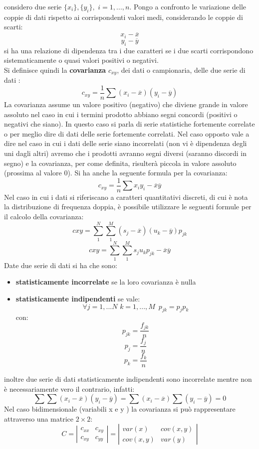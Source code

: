 \documentclass[a4paper,12pt, oneside]{book}
\begin{document}
considero due serie $\{x_i\},\{y_i\},\,\,i=1,...,n$. Pongo a confronto le variazione delle coppie di dati rispetto ai corrispondenti valori medi, considerando le coppie di scarti:
$$x_i-\overline{x}$$
$$y_i-\overline{y}$$
si ha una relazione di dipendenza tra i due caratteri se i due scarti corrispondono sistematicamente o quasi valori positivi o negativi.\\
Si definisce quindi la \textbf{covarianza} $c_{xy}$, dei dati o campionaria, delle due serie di dati :
$$c_{xy}=\frac{1}{n}\sum (x_i-\overline{x})(y_i-\overline{y})$$
La covarianza assume un valore positivo (negativo) che diviene grande in valore assoluto nel caso in cui i termini prodotto abbiano segni concordi (positivi o negativi che siano). In questo caso si parla di serie statistiche fortemente correlate o per meglio dire di
dati delle serie fortemente correlati. Nel caso opposto vale a dire nel caso in cui i dati delle serie siano incorrelati (non vi è dipendenza degli uni dagli altri) avremo che i prodotti avranno segni diversi (saranno discordi in segno) e la covarianza, per come definita,
risulterà piccola in valore assoluto (prossima al valore 0).
Si ha anche la seguente formula per la covarianza:
$$c_{xy}=\frac{1}{n}\sum x_iy_i-\overline{x}\overline{y}$$
Nel caso in cui i dati si riferiscano a caratteri quantitativi discreti, di cui è nota la
distribuzione di frequenza doppia, è possibile utilizzare le seguenti formule per il calcolo della covarianza:
$$c{xy}=\sum_1^N\sum_1^M(s_j-\overline{x})(u_k-\overline{y})p_{jk}$$
$$c{xy}=\sum_1^N\sum_1^Ms_ju_kp_{jk}-\overline{x}\overline{y}$$
Date due serie di dati si ha che sono:
\begin{itemize}
\item \textbf{statisticamente incorrelate} se la loro covarianza è nulla
\item \textbf{statisticamente indipendenti} se vale:
$$\forall j=1,...N\,\,k=1,...,M\,\,\, p_{jk}=p_jp_k$$
con:
$$p_{jk}=\frac{f_{jk}}{n}$$
$$p_{j}=\frac{f_{j}}{n}$$
$$p_{k}=\frac{f_{k}}{n}$$
\end{itemize}
inoltre due serie di dati statisticamente indipendenti sono incorrelate mentre non è necessariamente vero il contrario, infatti:
$$\sum \sum (x_i-\overline{x})(y_i-\overline{y})=\sum (x_i-\overline{x})\sum(y_i-\overline{y})=0$$
Nel caso bidimensionale (variabili x e y ) la covarianza si può rappresentare
attraverso una matrice $2\times 2$:
$$C=\left|\begin{matrix}
c_{xx} & c_{xy}\\
c_{xy} & c_	{yy}
\end{matrix}\right|=\left|\begin{matrix}
var(x) & cov(x,y)\\
cov(x,y) & var(y)
\end{matrix}\right|$$
\end{document}
